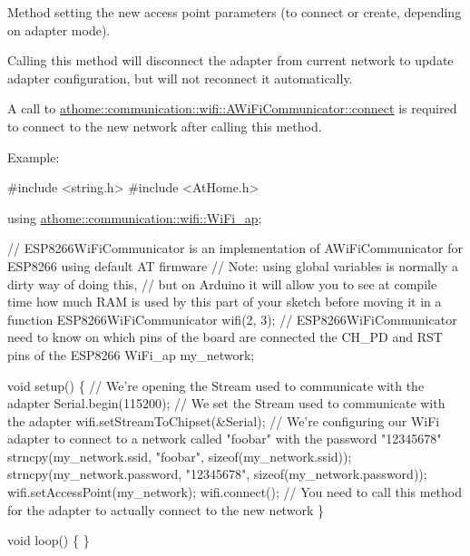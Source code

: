 Method setting the new access point parameters (to connect or create, depending on adapter mode).

Calling this method will disconnect the adapter from current network to update adapter configuration, but will not reconnect it automatically.

A call to \mbox{\hyperlink{classathome_1_1communication_1_1wifi_1_1_a_wi_fi_communicator_a309927109fbc19aa0fb2afb71d50bbf9}{athome\+::communication\+::wifi\+::\+A\+Wi\+Fi\+Communicator\+::connect}} is required to connect to the new network after calling this method.

Example\+:


\begin{DoxyCode}
\textcolor{preprocessor}{#include <string.h>}
\textcolor{preprocessor}{#include <AtHome.h>}

\textcolor{keyword}{using} \mbox{\hyperlink{structathome_1_1communication_1_1wifi_1_1s__wifi__access__point}{athome::communication::wifi::WiFi\_ap}};

\textcolor{comment}{// ESP8266WiFiCommunicator is an implementation of AWiFiCommunicator for ESP8266 using default AT firmware}
\textcolor{comment}{// Note: using global variables is normally a dirty way of doing this,}
\textcolor{comment}{// but on Arduino it will allow you to see at compile time how much RAM is used by this part of your sketch
       before moving it in a function}
ESP8266WiFiCommunicator wifi(2, 3); \textcolor{comment}{// ESP8266WiFiCommunicator need to know on which pins of the board are
       connected the CH\_PD and RST pins of the ESP8266}
WiFi\_ap my\_network;

\textcolor{keywordtype}{void} setup() \{
  \textcolor{comment}{// We're opening the Stream used to communicate with the adapter}
  Serial.begin(115200);
  \textcolor{comment}{// We set the Stream used to communicate with the adapter}
  wifi.setStreamToChipset(&Serial);
  \textcolor{comment}{// We're configuring our WiFi adapter to connect to a network called "foobar" with the password
       "12345678"}
  strncpy(my\_network.ssid, \textcolor{stringliteral}{"foobar"}, \textcolor{keyword}{sizeof}(my\_network.ssid));
  strncpy(my\_network.password, \textcolor{stringliteral}{"12345678"}, \textcolor{keyword}{sizeof}(my\_network.password));
  wifi.setAccessPoint(my\_network);
  wifi.connect(); \textcolor{comment}{// You need to call this method for the adapter to actually connect to the new network}
\}

\textcolor{keywordtype}{void} loop() \{
\}
\end{DoxyCode}
 \mbox{\label{classathome_1_1communication_1_1wifi_1_1_a_wi_fi_communicator_a31fb91672f298718d99bb9776dfe46c9}} 
